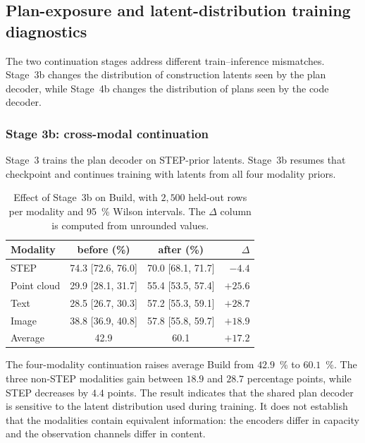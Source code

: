 \documentclass[preprint,12pt]{elsarticle}
\begin{document}
\subsection{Plan-exposure and latent-distribution training diagnostics}
\label{app:exposure}

The two continuation stages address different train--inference mismatches. Stage~3b changes
the distribution of construction latents seen by the plan decoder, while Stage~4b changes the
distribution of plans seen by the code decoder.

\subsubsection{Stage 3b: cross-modal continuation}
\label{app:stage3b}

Stage~3 trains the plan decoder on STEP-prior latents. Stage~3b resumes that checkpoint and
continues training with latents from all four modality priors.

\begin{table}[htbp]
  \centering
  \footnotesize
  \caption{Effect of Stage~3b on Build, with $2{,}500$ held-out rows per modality and
    95~\% Wilson intervals. The $\Delta$ column is computed from unrounded values.}
  \label{tab:stage3b}
  \begin{tabular}{lccr}
    \toprule
    Modality    & before (\%)       & after (\%)        & $\Delta$         \\
    \midrule
    STEP        & 74.3 [72.6, 76.0] & 70.0 [68.1, 71.7] & \textbf{$-4.4$}  \\
    Point cloud & 29.9 [28.1, 31.7] & 55.4 [53.5, 57.4] & \textbf{$+25.6$} \\
    Text        & 28.5 [26.7, 30.3] & 57.2 [55.3, 59.1] & \textbf{$+28.7$} \\
    Image       & 38.8 [36.9, 40.8] & 57.8 [55.8, 59.7] & \textbf{$+18.9$} \\
    \midrule
    Average     & 42.9              & 60.1              & \textbf{$+17.2$} \\
    \bottomrule
  \end{tabular}
\end{table}

The four-modality continuation raises average Build from $42.9$~\% to $60.1$~\%. The three
non-STEP modalities gain between $18.9$ and $28.7$ percentage points, while STEP decreases
by $4.4$ points. The result indicates that the shared plan decoder is sensitive to the latent
distribution used during training. It does not establish that the modalities contain equivalent
information: the encoders differ in capacity and the observation channels differ in content.
\end{document}
